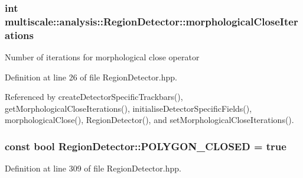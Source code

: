\hypertarget{classmultiscale_1_1analysis_1_1RegionDetector_a700a2f299d7c56fbd1fdbec68092f23a}{
\subsubsection[{morphological\-Close\-Iterations}]{\setlength{\rightskip}{0pt plus 5cm}int {\bf multiscale\-::analysis\-::\-Region\-Detector\-::morphological\-Close\-Iterations}}}\label{classmultiscale_1_1analysis_1_1RegionDetector_a700a2f299d7c56fbd1fdbec68092f23a}
\-Number of iterations for morphological close operator 

\-Definition at line 26 of file \-Region\-Detector.\-hpp.



\-Referenced by create\-Detector\-Specific\-Trackbars(), get\-Morphological\-Close\-Iterations(), initialise\-Detector\-Specific\-Fields(), morphological\-Close(), \-Region\-Detector(), and set\-Morphological\-Close\-Iterations().

\hypertarget{classmultiscale_1_1analysis_1_1RegionDetector_a1b3de2646beaac60d03527f1775614be}{
\subsubsection[{\-P\-O\-L\-Y\-G\-O\-N\-\_\-\-C\-L\-O\-S\-E\-D}]{\setlength{\rightskip}{0pt plus 5cm}const bool {\bf \-Region\-Detector\-::\-P\-O\-L\-Y\-G\-O\-N\-\_\-\-C\-L\-O\-S\-E\-D} = true}}\label{classmultiscale_1_1analysis_1_1RegionDetector_a1b3de2646beaac60d03527f1775614be}


\-Definition at line 309 of file \-Region\-Detector.\-hpp.



